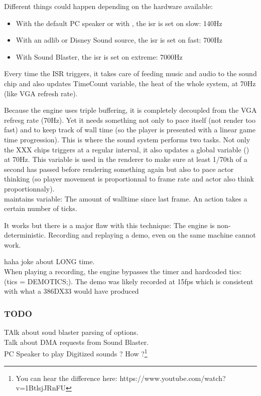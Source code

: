 Different things could happen depending on the hardware available:
\begin{itemize}
\item With the default PC speaker or with , the isr is set on slow: 140Hz
\item With an adlib or Disney Sound source, the isr is set on fast: 700Hz
\item With Sound Blaster, the isr is set on extreme: 7000Hz
\end{itemize}
Every time the ISR triggers, it takes care of feeding music and audio to the sound chip and also updates TimeCount variable, the heat of the whole system, at 70Hz (like VGA refresh rate).\\
\par
Because the engine uses triple buffering, it is completely decoupled from the VGA refresg rate (70Hz). Yet it needs something not only to pace itself (not render too fast) and to keep track of wall time (so the player is presented with a linear game time progression). This is where the sound system performs two tasks. Not only the XXX chips triggers at a regular interval, it also updates a global variable () at 70Hz. This variable is used in the renderer to make sure at least 1/70th of a second has passed before rendering something again but also to pace actor thinking (so player movement is proportionnal to frame rate and actor also think proportionnaly).\\
 maintains  variable: The amount of walltime since last frame. An action takes a certain number of ticks.\\
\par
It works but there is a major flaw with this technique: The engine is non-deterministic. Recording and replaying a demo, even on the same machine cannot work.\\\par
haha joke about LONG time.\\
 When playing a recording, the engine bypasses the timer and hardcoded tics: (tics = DEMOTICS;). The demo was likely recorded at 15fps which is consistent with what a 386DX33 would have produced

\subsubsection{TODO}
TAlk about soud blaster parsing of options.\\
Talk about DMA requests from Sound Blaster.\\
PC Speaker to play Digitized sounds ? How  ?\footnote{You can hear the difference here: https://www.youtube.com/watch?v=1BtlsjJRnFU}\\





















